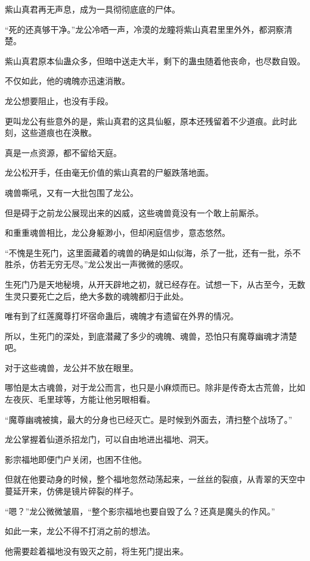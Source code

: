
\begin{this_body}

紫山真君再无声息，成为一具彻彻底底的尸体。

“死的还真够干净。”龙公冷哂一声，冷漠的龙瞳将紫山真君里里外外，都洞察清楚。

紫山真君原本仙蛊众多，但暗中送走大半，剩下的蛊虫随着他丧命，也尽数自毁。

不仅如此，他的魂魄亦迅速消散。

龙公想要阻止，也没有手段。

更叫龙公有些意外的是，紫山真君的这具仙躯，原本还残留着不少道痕。此时此刻，这些道痕也在涣散。

真是一点资源，都不留给天庭。

龙公松开手，任由毫无价值的紫山真君的尸躯跌落地面。

魂兽嘶吼，又有一大批包围了龙公。

但是碍于之前龙公展现出来的凶威，这些魂兽竟没有一个敢上前厮杀。

和重重魂兽相比，龙公身躯渺小，但却闲庭信步，意态悠然。

“不愧是生死门，这里面藏着的魂兽的确是如山似海，杀了一批，还有一批，杀不胜杀，仿若无穷无尽。”龙公发出一声微微的感叹。

生死门乃是天地秘境，从开天辟地之初，就已经存在。试想一下，从古至今，无数生灵只要死亡之后，绝大多数的魂魄都归于此处。

唯有到了红莲魔尊打坏宿命蛊后，魂魄才有遗留在外界的情况。

所以，生死门的深处，到底潜藏了多少的魂魄、魂兽，恐怕只有魔尊幽魂才清楚吧。

对于这些魂兽，龙公并不放在眼里。

哪怕是太古魂兽，对于龙公而言，也只是小麻烦而已。除非是传奇太古荒兽，比如左夜灰、毛里球等，方能让他另眼相看。

“魔尊幽魂被擒，最大的分身也已经灭亡。是时候到外面去，清扫整个战场了。”

龙公掌握着仙道杀招龙门，可以自由地进出福地、洞天。

影宗福地即便门户关闭，也困不住他。

但就在他要动身的时候，整个福地忽然动荡起来，一丝丝的裂痕，从青翠的天空中蔓延开来，仿佛是镜片碎裂的样子。

“嗯？”龙公微微皱眉，“整个影宗福地也要自毁了么？还真是魔头的作风。”

如此一来，龙公不得不打消之前的想法。

他需要趁着福地没有毁灭之前，将生死门提出来。


\end{this_body}
